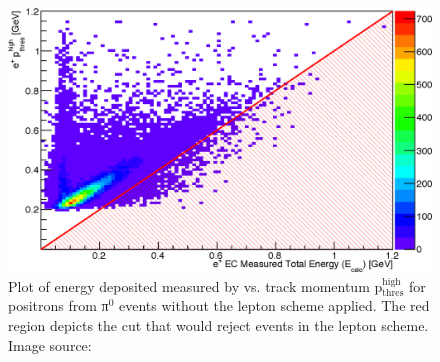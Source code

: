 \begin{figure}\begin{center}
\includegraphics[width=0.45\columnwidth]{figures/lepton/Pip_EChighcut.eps}
\caption[ Deposited Energy Comparison to Track Momentum for e$^+$ from π$^0$ Events]{\label{fig:islep.pipECcut}Plot of energy deposited measured by  vs. track momentum p$\mathrm{_{thres}^{high}}$ for positrons from π$^0$ events without the  lepton   scheme applied. The red region depicts the cut that would reject events in the  lepton   scheme. Image source:~\cite{clas.thesis.kunkel}}
\end{center}\end{figure}
%


\FloatBarrier
